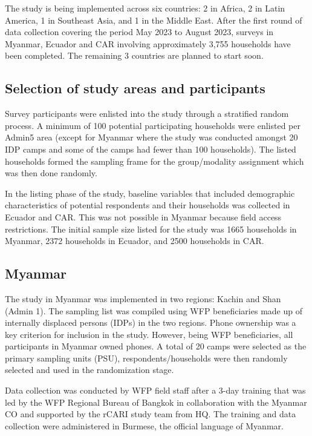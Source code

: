 \documentclass[11pt,harvard]{article}
\begin{document}
The study is being implemented across six countries: 2 in Africa, 2 in Latin America, 1 in Southeast Asia, and 1 in the Middle East. After the first round of data collection covering the period May 2023 to August 2023, surveys in Myanmar, Ecuador and CAR involving approximately 3,755 households have been completed. The remaining 3 countries are planned to start soon.
	
	\subsection{Selection of study areas and participants}
	
Survey participants were enlisted into the study through a stratified random process. A minimum of 100 potential participating households were enlisted per Admin5 area (except for Myanmar where the study was conducted amongst 20 IDP camps and some of the camps had fewer than 100 households). The listed households formed the sampling frame for the group/modality assignment which was then done randomly. 
	
In the listing phase of the study, baseline variables that included demographic characteristics of potential respondents and their households was collected in Ecuador and CAR. This was not possible in Myanmar because field access restrictions. The initial sample size listed for the study was 1665 households in Myanmar, 2372 households in Ecuador, and 2500 households in CAR. 
	
	
	\subsection{Myanmar}
	
The study in Myanmar was implemented in two regions: Kachin and Shan (Admin 1). The sampling list was compiled using WFP beneficiaries made up of internally displaced persons (IDPs) in the two regions. Phone ownership was a key criterion for inclusion in the study. However, being WFP beneficiaries, all participants in Myanmar owned phones. A total of 20 camps were selected as the primary sampling units (PSU), respondents/households were then randomly selected and used in the randomization stage.

Data collection was conducted by WFP field staff after a 3-day training that was led by the WFP Regional Bureau of Bangkok in collaboration with the Myanmar CO and supported by the rCARI study team from HQ.  The training and data collection were administered in Burmese, the official language of Myanmar. 
\end{document}
